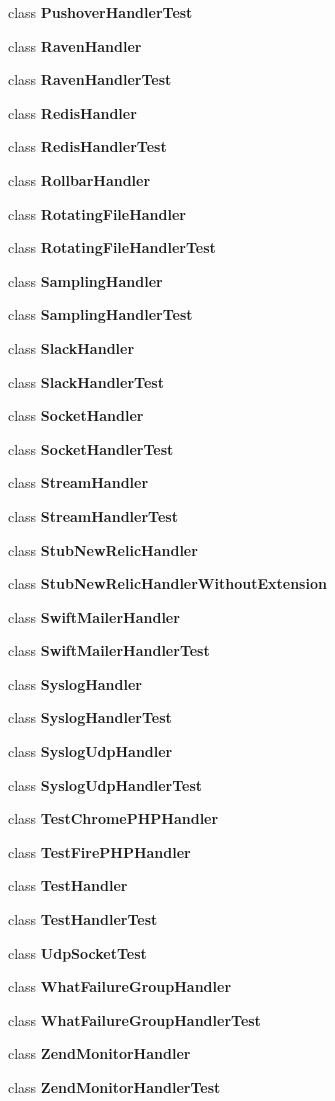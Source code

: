 \begin{DoxyCompactItemize}
\item 
class {\bf Pushover\+Handler\+Test}
\item 
class {\bf Raven\+Handler}
\item 
class {\bf Raven\+Handler\+Test}
\item 
class {\bf Redis\+Handler}
\item 
class {\bf Redis\+Handler\+Test}
\item 
class {\bf Rollbar\+Handler}
\item 
class {\bf Rotating\+File\+Handler}
\item 
class {\bf Rotating\+File\+Handler\+Test}
\item 
class {\bf Sampling\+Handler}
\item 
class {\bf Sampling\+Handler\+Test}
\item 
class {\bf Slack\+Handler}
\item 
class {\bf Slack\+Handler\+Test}
\item 
class {\bf Socket\+Handler}
\item 
class {\bf Socket\+Handler\+Test}
\item 
class {\bf Stream\+Handler}
\item 
class {\bf Stream\+Handler\+Test}
\item 
class {\bf Stub\+New\+Relic\+Handler}
\item 
class {\bf Stub\+New\+Relic\+Handler\+Without\+Extension}
\item 
class {\bf Swift\+Mailer\+Handler}
\item 
class {\bf Swift\+Mailer\+Handler\+Test}
\item 
class {\bf Syslog\+Handler}
\item 
class {\bf Syslog\+Handler\+Test}
\item 
class {\bf Syslog\+Udp\+Handler}
\item 
class {\bf Syslog\+Udp\+Handler\+Test}
\item 
class {\bf Test\+Chrome\+P\+H\+P\+Handler}
\item 
class {\bf Test\+Fire\+P\+H\+P\+Handler}
\item 
class {\bf Test\+Handler}
\item 
class {\bf Test\+Handler\+Test}
\item 
class {\bf Udp\+Socket\+Test}
\item 
class {\bf What\+Failure\+Group\+Handler}
\item 
class {\bf What\+Failure\+Group\+Handler\+Test}
\item 
class {\bf Zend\+Monitor\+Handler}
\item 
class {\bf Zend\+Monitor\+Handler\+Test}
\end{DoxyCompactItemize}
